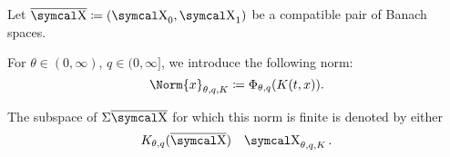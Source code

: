 \begin{definition}\label{def:k_functional_interpolation_space}
  Let \( \Ol{\CX} \coloneqq ( \CX_0, \CX_1 ) \) be a compatible pair of Banach spaces.

  For \( \theta \in (0, \infty) \), \( q \in (0, \infty] \), we introduce the following norm:
  \begin{equation}\label{eq:def:k_functional_interpolation_space/norm}
    \Norm{x}_{\theta,q,K} \coloneqq \Phi_{\theta,q}(K(t, x)).
  \end{equation}

  The subspace of \( \Sigma\Ol{\CX} \) for which this norm is finite is denoted by either
  \begin{align*}
    K_{\theta,q}(\Ol{\CX})
    &&
    \CX_{\theta,q,K}.
  \end{align*}
\end{definition}

